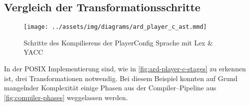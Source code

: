 \subsection{Vergleich der Transformationsschritte}\label{subsec:vergleich-der-transformationsschritte}
\begin{figure}[H]
    \begin{framed}
        
    \end{framed}
    \begin{framed}
        
    \end{framed}
    \begin{framed}
        \texttt{[image: ../assets/img/diagrams/ard\_player\_c\_ast.mmd]}
    \end{framed}
    \begin{framed}
        
    \end{framed}
    \caption{Schritte des Kompilierens der PlayerConfig Sprache mit Lex \& \acs{YACC}}
    \label{fig:ard-player-c-stages}
\end{figure}
In der \ac{POSIX} Implementierung sind, wie in \autoref{fig:ard-player-c-stages} zu erkennen ist, drei Transformationen notwendig.
Bei diesem Beispiel konnten auf Grund mangelnder Komplexität einige Phasen aus der Compiler--Pipeline aus \autoref{fig:compiler-phases} weggelassen werden.

